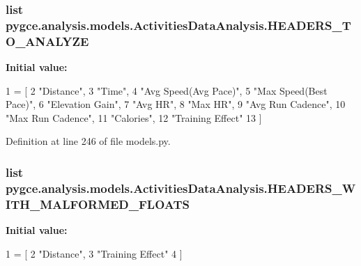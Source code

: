 \subsubsection[{\texorpdfstring{H\+E\+A\+D\+E\+R\+S\+\_\+\+T\+O\+\_\+\+A\+N\+A\+L\+Y\+ZE}{HEADERS_TO_ANALYZE}}]{\setlength{\rightskip}{0pt plus 5cm}list pygce.\+analysis.\+models.\+Activities\+Data\+Analysis.\+H\+E\+A\+D\+E\+R\+S\+\_\+\+T\+O\+\_\+\+A\+N\+A\+L\+Y\+ZE\hspace{0.3cm}{\ttfamily [static]}}\hypertarget{classpygce_1_1analysis_1_1models_1_1_activities_data_analysis_a799ad90125cc686b985fe525a3b33062}{}\label{classpygce_1_1analysis_1_1models_1_1_activities_data_analysis_a799ad90125cc686b985fe525a3b33062}
{\bfseries Initial value\+:}
\begin{DoxyCode}
1 = [
2         \textcolor{stringliteral}{"Distance"},
3         \textcolor{stringliteral}{"Time"},
4         \textcolor{stringliteral}{"Avg Speed(Avg Pace)"},
5         \textcolor{stringliteral}{"Max Speed(Best Pace)"},
6         \textcolor{stringliteral}{"Elevation Gain"},
7         \textcolor{stringliteral}{"Avg HR"},
8         \textcolor{stringliteral}{"Max HR"},
9         \textcolor{stringliteral}{"Avg Run Cadence"},
10         \textcolor{stringliteral}{"Max Run Cadence"},
11         \textcolor{stringliteral}{"Calories"},
12         \textcolor{stringliteral}{"Training Effect"}
13     ]
\end{DoxyCode}


Definition at line 246 of file models.\+py.

\subsubsection[{\texorpdfstring{H\+E\+A\+D\+E\+R\+S\+\_\+\+W\+I\+T\+H\+\_\+\+M\+A\+L\+F\+O\+R\+M\+E\+D\+\_\+\+F\+L\+O\+A\+TS}{HEADERS_WITH_MALFORMED_FLOATS}}]{\setlength{\rightskip}{0pt plus 5cm}list pygce.\+analysis.\+models.\+Activities\+Data\+Analysis.\+H\+E\+A\+D\+E\+R\+S\+\_\+\+W\+I\+T\+H\+\_\+\+M\+A\+L\+F\+O\+R\+M\+E\+D\+\_\+\+F\+L\+O\+A\+TS\hspace{0.3cm}{\ttfamily [static]}}\hypertarget{classpygce_1_1analysis_1_1models_1_1_activities_data_analysis_a272e010f956a64a8f916ebf1b9e14255}{}\label{classpygce_1_1analysis_1_1models_1_1_activities_data_analysis_a272e010f956a64a8f916ebf1b9e14255}
{\bfseries Initial value\+:}
\begin{DoxyCode}
1 = [
2         \textcolor{stringliteral}{"Distance"},
3         \textcolor{stringliteral}{"Training Effect"}
4     ]
\end{DoxyCode}


